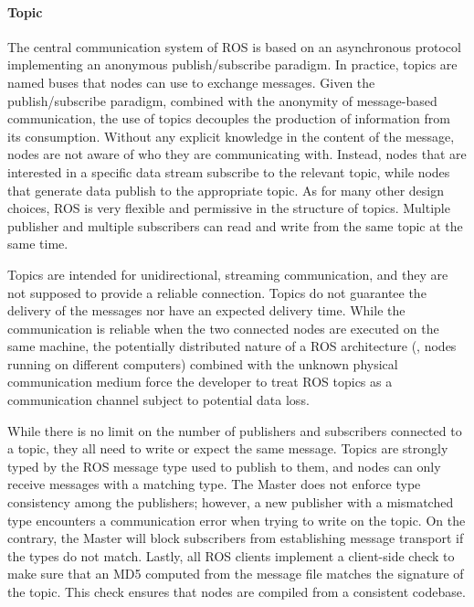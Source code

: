 \paragraph{Topic} The central communication system of ROS is based on an asynchronous protocol implementing an anonymous publish/subscribe paradigm. In practice, topics are named buses that nodes can use to exchange messages. Given the publish/subscribe paradigm, combined with the anonymity of message-based communication, the use of topics decouples the production of information from its consumption. Without any explicit knowledge in the content of the message, nodes are not aware of who they are communicating with. Instead, nodes that are interested in a specific data stream subscribe to the relevant topic, while nodes that generate data publish to the appropriate topic. As for many other design choices, ROS is very flexible and permissive in the structure of topics. Multiple publisher and multiple subscribers can read and write from the same topic at the same time.

Topics are intended for unidirectional, streaming communication, and they are not supposed to provide a reliable connection. Topics do not guarantee the delivery of the messages nor have an expected delivery time. While the communication is reliable when the two connected nodes are executed on the same machine, the potentially distributed nature of a ROS architecture (\ie, nodes running on different computers) combined with the unknown physical communication medium force the developer to treat ROS topics as a communication channel subject to potential data loss.

While there is no limit on the number of publishers and subscribers connected to a topic, they all need to write or expect the same message. Topics are strongly typed by the ROS message type used to publish to them, and nodes can only receive messages with a matching type. The Master does not enforce type consistency among the publishers; however, a new publisher with a mismatched type encounters a communication error when trying to write on the topic. On the contrary, the Master will block subscribers from establishing message transport if the types do not match. Lastly, all ROS clients implement a client-side check to make sure that an MD5 computed from the message file matches the signature of the topic. This check ensures that nodes are compiled from a consistent codebase.

